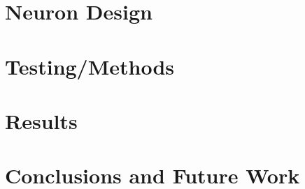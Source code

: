 \documentclass[12pt, letterpaper, oneside, onecolumn]{report} %
\begin{document}
\chapter{Neuron Design}
\label{chap:neuron_design}


\chapter{Testing/Methods}
\label{chap:methods}


\chapter{Results}
\label{chap:results}


\chapter{Conclusions and Future Work}
\label{chap:conclusion}


\newpage
\label{chap:references}
\printbibliography[heading=bibintoc, title={Bibliography}]
\end{document}
